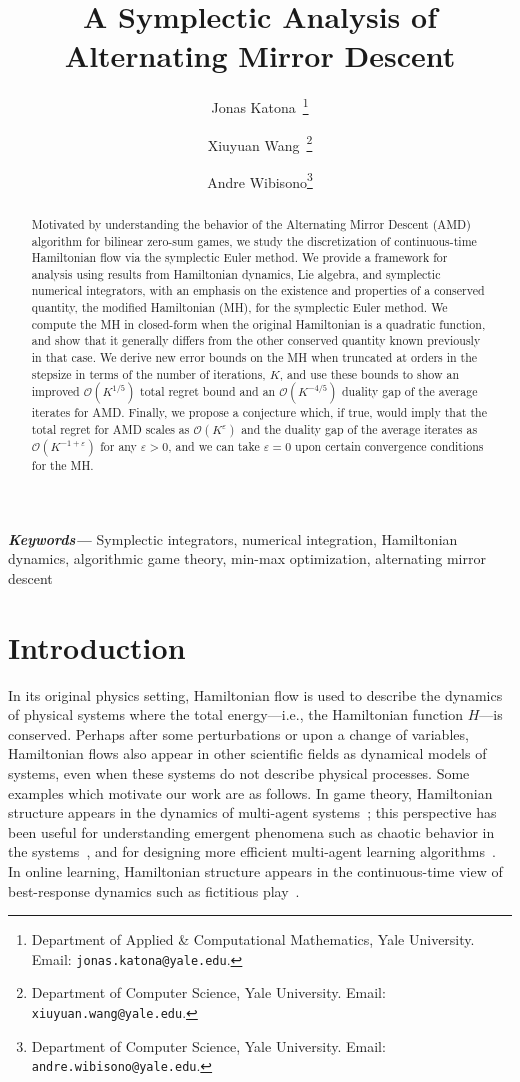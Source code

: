 \documentclass[11pt]{article}
\title{A Symplectic Analysis of Alternating Mirror Descent}
\author{Jonas Katona~\thanks{Department of Applied \& Computational Mathematics, Yale University. Email: \texttt{jonas.katona@yale.edu}.} \and Xiuyuan Wang~\thanks{Department of Computer Science, Yale University. Email: \texttt{xiuyuan.wang@yale.edu}.} \and Andre Wibisono\thanks{Department of Computer Science, Yale University. Email: \texttt{andre.wibisono@yale.edu}.}}
\providecommand{\keywords}[1]{\textbf{\textit{Keywords---}} #1}
\begin{document}
\maketitle

\begin{abstract}    
    Motivated by understanding the behavior of the Alternating Mirror Descent (AMD) algorithm for bilinear zero-sum games, we study the discretization of continuous-time Hamiltonian flow via the symplectic Euler method. We provide a framework for analysis using results from Hamiltonian dynamics, Lie algebra, and symplectic numerical integrators, with an emphasis on the existence and properties of a conserved quantity, the modified Hamiltonian (MH), for the symplectic Euler method. 
    We compute the MH in closed-form when the original Hamiltonian is a quadratic function, and show that it generally differs from the other conserved quantity  known previously in that case. We derive new error bounds on the MH when truncated at orders in the stepsize in terms of the number of iterations, $K$, and use these bounds to show an improved $\mathcal{O}(K^{1/5})$ total regret bound and an $\mathcal{O}(K^{-4/5})$ duality gap of the average iterates for AMD. Finally, we propose a conjecture which, if true, would imply that the total regret for AMD scales as $\mathcal{O}\left(K^{\varepsilon}\right)$ and the duality gap of the average iterates as $\mathcal{O}\left(K^{-1+\varepsilon}\right)$ for any $\varepsilon>0$, and we can take $\varepsilon=0$ upon certain convergence conditions for the MH.
\end{abstract}

\keywords{Symplectic integrators, numerical integration, Hamiltonian dynamics, algorithmic game theory, min-max optimization, alternating mirror descent}

\section{Introduction}\label{intro}
 
In its original physics setting, Hamiltonian flow is used to describe the dynamics of physical systems where the total energy---i.e., the Hamiltonian function $H$---is conserved. 
Perhaps after some perturbations or upon a change of variables, Hamiltonian flows also appear in other scientific fields as dynamical models of systems, even when these systems do not describe physical processes. Some examples which motivate our work are as follows. In game theory, Hamiltonian structure appears in the dynamics of multi-agent systems~\citep{hofbauer1996evolutionary,bailey2019multi}; this perspective has been useful for understanding emergent phenomena such as chaotic behavior in the systems~\citep{sato2002chaos, piliouras2021constants}, and for designing more efficient multi-agent learning algorithms~\citep{balduzzi2018mechanics}. In online learning, Hamiltonian structure appears in the continuous-time view of best-response dynamics such as fictitious play~\citep{ostrovski2011piecewise,van2011hamiltonian}.
\end{document}
